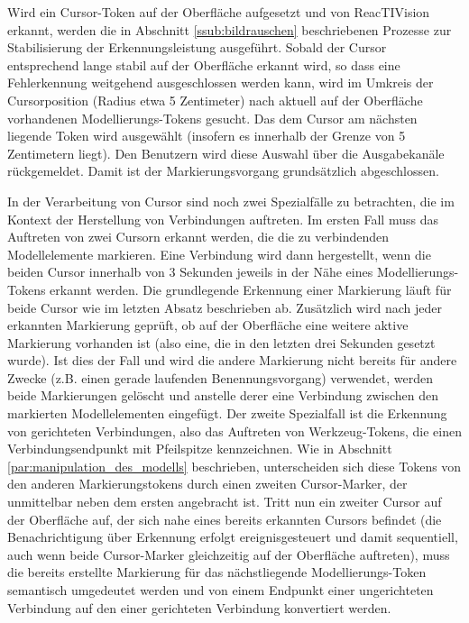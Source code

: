 Wird ein Cursor-Token auf der Oberfläche aufgesetzt und von ReacTIVision erkannt, werden die in Abschnitt \ref{ssub:bildrauschen} beschriebenen Prozesse zur Stabilisierung der Erkennungsleistung ausgeführt. Sobald der Cursor entsprechend lange stabil auf der Oberfläche erkannt wird, so dass eine Fehlerkennung weitgehend ausgeschlossen werden kann, wird im Umkreis der Cursorposition (Radius etwa 5 Zentimeter) nach aktuell auf der Oberfläche vorhandenen Modellierungs-Tokens gesucht. Das dem Cursor am nächsten liegende Token wird ausgewählt (insofern es innerhalb der Grenze von 5 Zentimetern liegt). Den Benutzern wird diese Auswahl über die Ausgabekanäle rückgemeldet. Damit ist der Markierungsvorgang grundsätzlich abgeschlossen.

In der Verarbeitung von Cursor sind noch zwei Spezialfälle zu betrachten, die im Kontext der Herstellung von Verbindungen auftreten. Im ersten Fall muss das Auftreten von zwei Cursorn erkannt werden, die die zu verbindenden Modellelemente markieren. Eine Verbindung wird dann hergestellt, wenn die beiden Cursor innerhalb von 3 Sekunden jeweils in der Nähe eines Modellierungs-Tokens erkannt werden. Die grundlegende Erkennung einer Markierung läuft für beide Cursor wie im letzten Absatz beschrieben ab. Zusätzlich wird nach jeder erkannten Markierung geprüft, ob auf der Oberfläche eine weitere aktive Markierung vorhanden ist (also eine, die in den letzten drei Sekunden gesetzt wurde). Ist dies der Fall und wird die andere Markierung nicht bereits für andere Zwecke (z.B. einen gerade laufenden Benennungsvorgang) verwendet, werden beide Markierungen gelöscht und anstelle derer eine Verbindung zwischen den markierten Modellelementen eingefügt. Der zweite Spezialfall ist die Erkennung von gerichteten Verbindungen, also das Auftreten von Werkzeug-Tokens, die einen Verbindungsendpunkt mit Pfeilspitze kennzeichnen. Wie in Abschnitt \ref{par:manipulation_des_modells} beschrieben, unterscheiden sich diese Tokens von den anderen Markierungstokens durch einen zweiten Cursor-Marker, der unmittelbar neben dem ersten angebracht ist. Tritt nun ein zweiter Cursor auf der Oberfläche auf, der sich nahe eines bereits erkannten Cursors befindet (die Benachrichtigung über Erkennung erfolgt ereignisgesteuert und damit sequentiell, auch wenn beide Cursor-Marker gleichzeitig auf der Oberfläche auftreten), muss die bereits erstellte Markierung für das nächstliegende Modellierungs-Token semantisch umgedeutet werden und von einem Endpunkt einer ungerichteten Verbindung auf den einer gerichteten Verbindung konvertiert werden.

